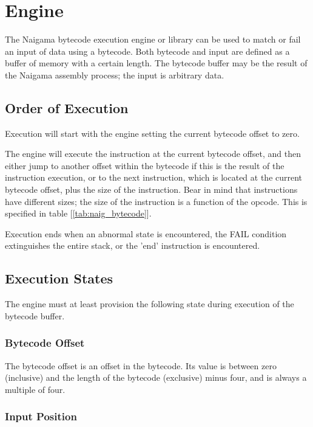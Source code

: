 \section{Engine}

The Naigama bytecode execution engine or library can be used to
match or fail an input of data using a bytecode.
Both bytecode and input are defined as a buffer of memory with
a certain length. The bytecode buffer may be the result of
the Naigama assembly process; the input is arbitrary data.

\subsection{Order of Execution}

Execution will start with the engine setting the current bytecode
offset to zero.

The engine will execute the instruction at the current bytecode
offset, and then either jump
to another offset within the bytecode if this is the result of
the instruction execution, or to the next instruction, which is
located at the current bytecode offset, plus the size of the
instruction. Bear in mind that instructions have different sizes;
the size of the instruction is a function of the opcode.
This is specified in table [\ref{tab:naig_bytecode}].

Execution ends when an abnormal state is encountered, the FAIL
condition extinguishes the entire stack, or the 'end' instruction
is encountered.

\subsection{Execution States}

The engine must at least provision the following state during execution
of the bytecode buffer.

\subsubsection{Bytecode Offset}

The bytecode offset is an offset in the bytecode. Its value is
between zero (inclusive) and the length of the bytecode (exclusive)
minus four, and is always a multiple of four.

\subsubsection{Input Position}

